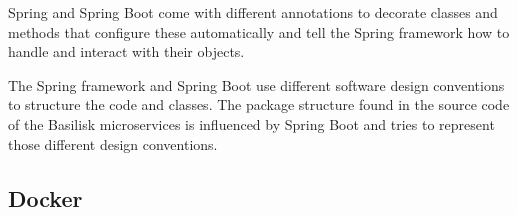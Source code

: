 Spring and Spring Boot come with different annotations to decorate classes and methods that configure these automatically and tell the Spring framework how to handle and interact with their objects.

The Spring framework and Spring Boot use different software design conventions to structure the code and classes.
The package structure found in the source code of the Basilisk microservices is influenced by Spring Boot and tries to represent those different design conventions.


\subsection{Docker}



%
%
%
%
%
%
%
%
%




